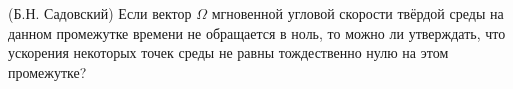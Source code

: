 (Б.Н. Садовский)
Если вектор $\Omega$ мгновенной угловой скорости твёрдой среды на данном
промежутке времени не обращается в ноль, то можно ли утверждать, что
ускорения некоторых точек среды не равны тождественно нулю на этом
промежутке?
